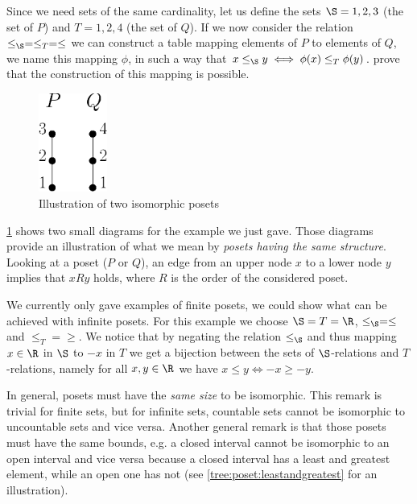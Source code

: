 Since we need sets of the same cardinality, let us define the sets $\S = {1, 2,
3}$ (the set of $P$) and $T = {1, 2, 4}$ (the set of $Q$). If we now consider
the relation $\le_{\S} = \le_T = \le$ we can construct a table mapping elements of
$P$ to elements of $Q$, we name this mapping $\phi$, in such a way that $x
\le_{\S} y \iff \phi(x) \le_T \phi(y)$. 
prove that the construction of this mapping is possible.

\begin{figure}
	\centering
	\includegraphics[width=0.2\textwidth]{fig/poset/iso/a}
	\caption{Illustration of two isomorphic posets}
	\label{fig:poset:iso:a}
\end{figure}

\ref{fig:poset:iso:a} shows two small diagrams for the example we just gave.
Those diagrams provide an illustration of what we mean by \emph{posets having
the same structure}. Looking at a poset ($P$ or $Q$), an edge from an upper
node $x$ to a lower node $y$ implies that $x R y$ holds, where $R$ is the order
of the considered poset.


We currently only gave examples of finite posets, we could show what can be
achieved with infinite posets. For this example we choose $\S = T = \R$,
$\le_{\S} = \le$ and $\le_T = \ge$. We notice that by negating the relation
$\le_{\S}$ and thus mapping $x \in \R$ in $\S$ to $-x$ in $T$ we get a
bijection between the sets of $\S$-relations and $T$-relations, namely for all
$x, y \in \R$ we have $x \le y \iff -x \ge -y$.

In general, posets must have the \emph{same size} to be isomorphic. This remark
is trivial for finite sets, but for infinite sets, countable sets cannot be
isomorphic to uncountable sets and vice versa. Another general remark is that
those posets must have the same bounds, e.g. a closed interval cannot be
isomorphic to an open interval and vice versa because a closed interval has a
least and greatest element, while an open one has not (see
\ref{tree:poset:leastandgreatest} for an illustration).

